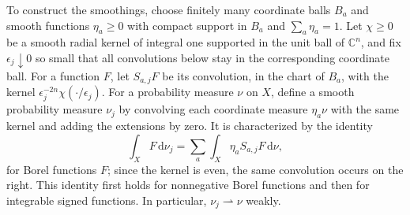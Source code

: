 To construct the smoothings, choose finitely many coordinate balls $B_a$ and smooth functions $\eta_a\geq0$ with compact support in $B_a$ and $\sum_a\eta_a=1$. Let $\chi\geq0$ be a smooth radial kernel of integral one supported in the unit ball of $\mathbb C^n$, and fix $\epsilon_j\downarrow0$ so small that all convolutions below stay in the corresponding coordinate ball. For a function $F$, let $S_{a,j}F$ be its convolution, in the chart of $B_a$, with the kernel $\epsilon_j^{-2n}\chi(\cdot/\epsilon_j)$. For a probability measure $\nu$ on $X$, define a smooth probability measure $\nu_j$ by convolving each coordinate measure $\eta_a\nu$ with the same kernel and adding the extensions by zero. It is characterized by the identity
\begin{equation}\label{eq:measure-smoothing-duality}
 \int_X F\,\mathrm{d}\nu_j
 =\sum_a\int_X\eta_a S_{a,j}F\,\mathrm{d}\nu,
\end{equation}
for Borel functions $F$; since the kernel is even, the same convolution occurs on the right. This identity first holds for nonnegative Borel functions and then for integrable signed functions. In particular, $\nu_j\rightharpoonup\nu$ weakly.


